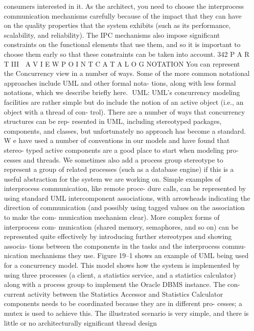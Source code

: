 consumers interested in it.
As the architect, you need to choose the interprocess communication
mechanisms carefully because of the impact that they can have on the quality
properties that the system exhibits (such as its performance, scalability, and
reliability). The IPC mechanisms also impose significant constraints on the
functional elements that use them, and so it is important to choose them early
so that these constraints can be taken into account.
342
 P A R T III  A V I E W P O I N T C A T A L O G
NOTATION You can represent the Concurrency view in a number of ways. Some
of the more common notational approaches include UML and other formal nota-
tions, along with less formal notations, which we describe briefly here.
UML: UML’s concurrency modeling facilities are rather simple but do
include the notion of an active object (i.e., an object with a thread of con-
trol). There are a number of ways that concurrency structures can be rep-
resented in UML, including stereotyped packages, components, and
classes, but unfortunately no approach has become a standard. W e have
used a number of conventions in our models and have found that stereo-
typed active components are a good place to start when modeling pro-
cesses and threads. We sometimes also add a process group stereotype to
represent a group of related processes (such as a database engine) if this
is a useful abstraction for the system we are working on.
Simple examples of interprocess communication, like remote proce-
dure calls, can be represented by using standard UML intercomponent
associations, with arrowheads indicating the direction of communication
(and possibly using tagged values on the association to make the com-
munication mechanism clear). More complex forms of interprocess com-
munication (shared memory, semaphores, and so on) can be represented
quite effectively by introducing further stereotypes and showing associa-
tions between the components in the tasks and the interprocess commu-
nication mechanisms they use.
Figure 19–1 shows an example of UML being used for a concurrency
model.
This model shows how the system is implemented by using three
processes (a client, a statistics service, and a statistics calculator) along
with a process group to implement the Oracle DBMS instance. The con-
current activity between the Statistics Accessor and Statistics Calculator
components needs to be coordinated because they are in different pro-
cesses; a mutex is used to achieve this. The illustrated scenario is very
simple, and there is little or no architecturally significant thread design
